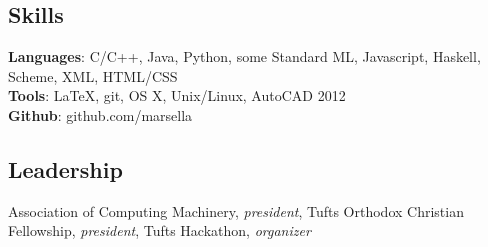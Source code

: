 \documentclass{article}
\newcommand{\skillNS}[2]{
  \textbf{#1}: #2
}
\begin{document}
\subsection*{Skills}
  \skillNS{Languages} {C/C++, Java, Python, some Standard ML, Javascript,
                    Haskell, Scheme, XML, HTML/CSS}\\
  \skillNS{Tools}     {LaTeX, git, OS X, Unix/Linux, AutoCAD 2012} \\
  \skillNS{Github}    {github.com/marsella}

\subsection*{Leadership}
  Association of Computing Machinery, \textit{president}, Tufts Orthodox
  Christian Fellowship, \textit{president}, Tufts Hackathon,
  \textit{organizer}
\end{document}
